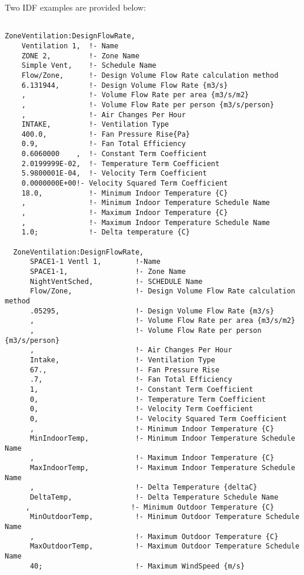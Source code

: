 Two IDF examples are provided below:

\begin{lstlisting}

ZoneVentilation:DesignFlowRate,
    Ventilation 1,  !- Name
    ZONE 2,         !- Zone Name
    Simple Vent,    !- Schedule Name
    Flow/Zone,      !- Design Volume Flow Rate calculation method
    6.131944,       !- Design Volume Flow Rate {m3/s}
    ,               !- Volume Flow Rate per area {m3/s/m2}
    ,               !- Volume Flow Rate per person {m3/s/person}
    ,               !- Air Changes Per Hour
    INTAKE,         !- Ventilation Type
    400.0,          !- Fan Pressure Rise{Pa}
    0.9,            !- Fan Total Efficiency
    0.6060000    ,  !- Constant Term Coefficient
    2.0199999E-02,  !- Temperature Term Coefficient
    5.9800001E-04,  !- Velocity Term Coefficient
    0.0000000E+00!- Velocity Squared Term Coefficient
    18.0,           !- Minimum Indoor Temperature {C}
    ,               !- Minimum Indoor Temperature Schedule Name
    ,               !- Maximum Indoor Temperature {C}
    ,               !- Maximum Indoor Temperature Schedule Name
    1.0;            !- Delta temperature {C}

  ZoneVentilation:DesignFlowRate,
      SPACE1-1 Ventl 1,        !-Name
      SPACE1-1,                !- Zone Name
      NightVentSched,          !- SCHEDULE Name
      Flow/Zone,               !- Design Volume Flow Rate calculation method
      .05295,                  !- Design Volume Flow Rate {m3/s}
      ,                        !- Volume Flow Rate per area {m3/s/m2}
      ,                        !- Volume Flow Rate per person {m3/s/person}
      ,                        !- Air Changes Per Hour
      Intake,                  !- Ventilation Type
      67.,                     !- Fan Pressure Rise
      .7,                      !- Fan Total Efficiency
      1,                       !- Constant Term Coefficient
      0,                       !- Temperature Term Coefficient
      0,                       !- Velocity Term Coefficient
      0,                       !- Velocity Squared Term Coefficient
      ,                        !- Minimum Indoor Temperature {C}
      MinIndoorTemp,           !- Minimum Indoor Temperature Schedule Name
      ,                        !- Maximum Indoor Temperature {C}
      MaxIndoorTemp,           !- Maximum Indoor Temperature Schedule Name
      ,                        !- Delta Temperature {deltaC}
      DeltaTemp,               !- Delta Temperature Schedule Name
     ,                        !- Minimum Outdoor Temperature {C}
      MinOutdoorTemp,          !- Minimum Outdoor Temperature Schedule Name
      ,                        !- Maximum Outdoor Temperature {C}
      MaxOutdoorTemp,          !- Maximum Outdoor Temperature Schedule Name
      40;                      !- Maximum WindSpeed {m/s}
\end{lstlisting}

